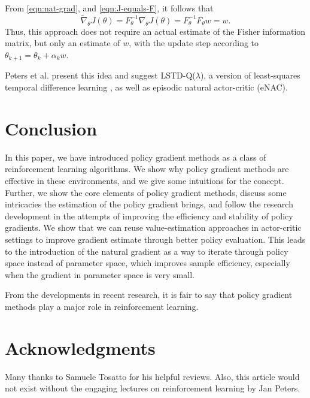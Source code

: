 \documentclass[conference, final]{IEEEtran}
\begin{document}
From \eqref{eqn:nat-grad}, and \eqref{eqn:J-equals-F}, it follows that
\begin{equation}
  \widetilde{\nabla}_\theta J(\theta) = F^{-1}_\theta \nabla_\theta J(\theta) = F_\theta^{-1} F_\theta w = w.
\end{equation}
Thus, this approach does not require an actual estimate of the Fisher information matrix, but only an estimate of $w$, with the update step according to $\theta_{k+1} = \theta_k + \alpha_k w$.

Peters et al. \cite{4863} present this idea and suggest LSTD-Q($\lambda$), a version of least-squares temporal difference learning  \cite{Boyan:1999:LTD:645528.657618}, as well as episodic natural actor-critic (eNAC).

\section{Conclusion}
\label{sec:outro}

In this paper, we have introduced policy gradient methods as a class of reinforcement learning algorithms. 
We show why policy gradient methods are effective in these environments, and we give some intuitions for the concept. 
Further, we show the core elements of policy gradient methods, discuss some intricacies the estimation of the policy gradient brings, and follow the research development in the attempts of improving the efficiency and stability of policy gradients.
We show that we can reuse value-estimation approaches in actor-critic settings to improve gradient estimate through better policy evaluation.
This leads to the introduction of the natural gradient as a way to iterate through policy space instead of parameter space, which improves sample efficiency, especially when the gradient in parameter space is very small.

From the developments in recent research, it is fair to say that policy gradient methods play a major role in reinforcement learning. 

\section*{Acknowledgments}

Many thanks to Samuele Tosatto for his helpful reviews. Also, this article would not exist without the engaging lectures on reinforcement learning by Jan Peters.



\end{document}
